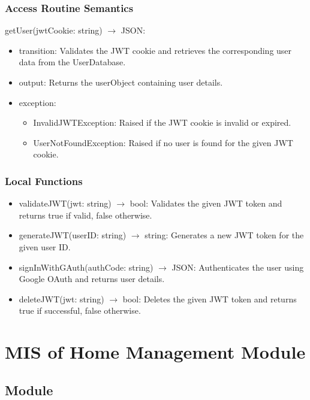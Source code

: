 \documentclass[12pt, titlepage]{article}
\begin{document}
\subsubsection{Access Routine Semantics}

\noindent getUser(jwtCookie: string) $\rightarrow$ JSON:
\begin{itemize}
\item transition: Validates the JWT cookie and retrieves the corresponding user data from the UserDatabase.
\item output: Returns the userObject containing user details.
\item exception: 
  \begin{itemize}
    \item InvalidJWTException: Raised if the JWT cookie is invalid or expired.
    \item UserNotFoundException: Raised if no user is found for the given JWT cookie.
  \end{itemize}
\end{itemize}


\subsubsection{Local Functions}

\begin{itemize}
  \item validateJWT(jwt: string) $\rightarrow$ bool: Validates the given JWT token and returns true if valid, false otherwise.
  \item generateJWT(userID: string) $\rightarrow$ string: Generates a new JWT token for the given user ID.
  \item signInWithGAuth(authCode: string) $\rightarrow$ JSON: Authenticates the user using Google OAuth and returns user details.
  \item deleteJWT(jwt: string) $\rightarrow$ bool: Deletes the given JWT token and returns true if successful, false otherwise.
\end{itemize}

\newpage


\section{MIS of Home Management Module} \label{Module} 

\subsection{Module}
\end{document}
